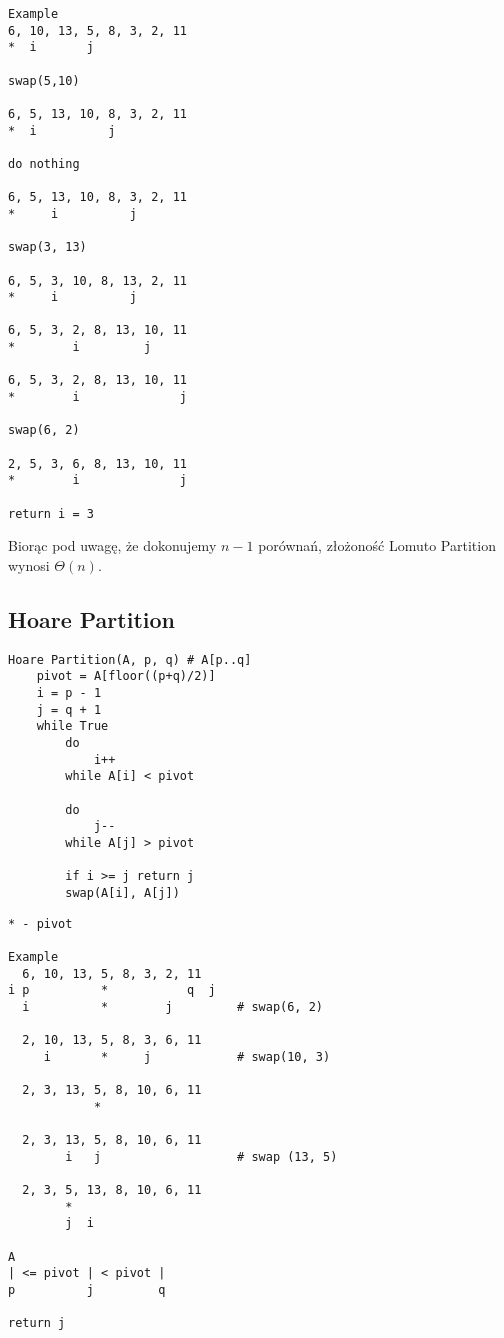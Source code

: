\documentclass{article}
\numberwithin{equation}{subsection}
\begin{document}
\begin{verbatim}
Example
6, 10, 13, 5, 8, 3, 2, 11
*  i       j

swap(5,10)

6, 5, 13, 10, 8, 3, 2, 11
*  i          j

do nothing

6, 5, 13, 10, 8, 3, 2, 11
*     i          j

swap(3, 13)

6, 5, 3, 10, 8, 13, 2, 11
*     i          j

6, 5, 3, 2, 8, 13, 10, 11
*        i         j   

6, 5, 3, 2, 8, 13, 10, 11
*        i              j

swap(6, 2)

2, 5, 3, 6, 8, 13, 10, 11
*        i              j

return i = 3

\end{verbatim}

Biorąc pod uwagę, że dokonujemy $n-1$ porównań, złożoność Lomuto Partition wynosi $\Theta(n)$.

\subsection{Hoare Partition}

\begin{verbatim}
Hoare Partition(A, p, q) # A[p..q]
    pivot = A[floor((p+q)/2)]
    i = p - 1
    j = q + 1
    while True
        do    
            i++
        while A[i] < pivot

        do 
            j--
        while A[j] > pivot

        if i >= j return j
        swap(A[i], A[j])
\end{verbatim}

\begin{verbatim}
* - pivot

Example
  6, 10, 13, 5, 8, 3, 2, 11
i p          *           q  j
  i          *        j         # swap(6, 2)
  
  2, 10, 13, 5, 8, 3, 6, 11
     i       *     j            # swap(10, 3)

  2, 3, 13, 5, 8, 10, 6, 11
            *

  2, 3, 13, 5, 8, 10, 6, 11
        i   j                   # swap (13, 5)

  2, 3, 5, 13, 8, 10, 6, 11
        *
        j  i
    
A
| <= pivot | < pivot |
p          j         q

return j
\end{verbatim}
\end{document}
